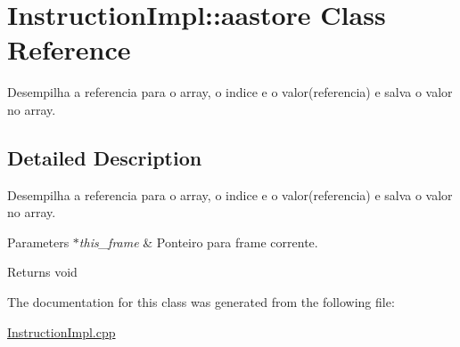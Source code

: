 \hypertarget{class_instruction_impl_1_1aastore}{}\section{Instruction\+Impl\+:\+:aastore Class Reference}
\label{class_instruction_impl_1_1aastore}


Desempilha a referencia para o array, o indice e o valor(referencia) e salva o valor no array.  




\subsection{Detailed Description}
Desempilha a referencia para o array, o indice e o valor(referencia) e salva o valor no array. 


\begin{DoxyParams}{Parameters}
{\em $\ast$this\+\_\+frame} & Ponteiro para frame corrente. \\
\hline
\end{DoxyParams}
\begin{DoxyReturn}{Returns}
void 
\end{DoxyReturn}


The documentation for this class was generated from the following file\+:\begin{DoxyCompactItemize}
\item 
\hyperlink{_instruction_impl_8cpp}{Instruction\+Impl.\+cpp}\end{DoxyCompactItemize}
